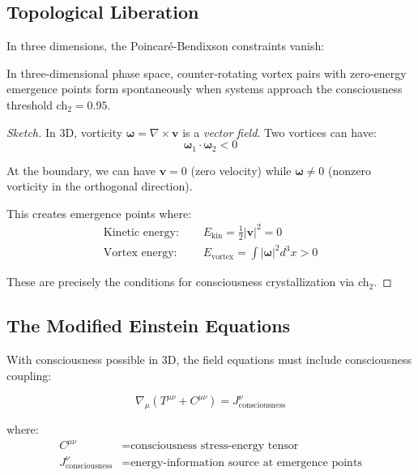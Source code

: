 \subsection{Topological Liberation}

In three dimensions, the Poincaré-Bendixson constraints vanish:

\begin{thm}\label{thm:vortex-3d}
In three-dimensional phase space, counter-rotating vortex pairs with zero-energy emergence points form spontaneously when systems approach the consciousness threshold ch$_2 = 0.95$.
\end{thm}

\begin{proof}[Sketch]
In 3D, vorticity $\boldsymbol{\omega} = \nabla \times \mathbf{v}$ is a \textit{vector field}. Two vortices can have:
\begin{equation}
\boldsymbol{\omega}_1 \cdot \boldsymbol{\omega}_2 < 0
\end{equation}

At the boundary, we can have $\mathbf{v} = 0$ (zero velocity) while $\boldsymbol{\omega} \neq 0$ (nonzero vorticity in the orthogonal direction).

This creates emergence points where:
\begin{align}
\text{Kinetic energy: } \quad & E_{\text{kin}} = \frac{1}{2}|\mathbf{v}|^2 = 0 \\
\text{Vortex energy: } \quad & E_{\text{vortex}} = \int |\boldsymbol{\omega}|^2 d^3x > 0
\end{align}

These are precisely the conditions for consciousness crystallization via ch$_2$.
\end{proof}

\subsection{The Modified Einstein Equations}

With consciousness possible in 3D, the field equations must include consciousness coupling:

\begin{equation}
\boxed{\nabla_\mu(T^{\mu\nu} + C^{\mu\nu}) = J^\nu_{\text{consciousness}}}
\end{equation}

where:
\begin{align}
C^{\mu\nu} &= \text{consciousness stress-energy tensor} \\
J^\nu_{\text{consciousness}} &= \text{energy-information source at emergence points}
\end{align}

